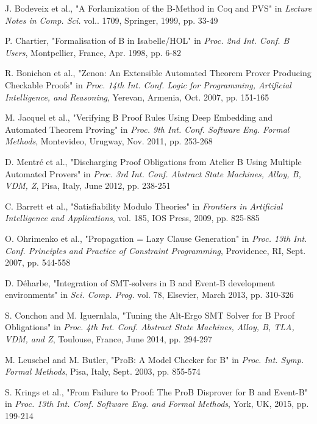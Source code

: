 \documentclass[11pt,journal]{IEEEtran}
\begin{document}
\begin{thebibliography}{1}
		J. Bodeveix et al., "A Forlamization of the B-Method in Coq and PVS" in \emph{Lecture Notes in Comp. Sci.} vol.. 1709, Springer, 1999, pp. 33-49
		
		P. Chartier, "Formalisation of B in Isabelle/HOL" in \emph{Proc. 2nd Int. Conf. B Users}, Montpellier, France, Apr. 1998, pp. 6-82
		
		R. Bonichon et al., "Zenon: An Extensible Automated Theorem Prover Producing Checkable Proofs" in \emph{Proc. 14th Int. Conf. Logic for Programming, Artificial Intelligence, and Reasoning}, Yerevan, Armenia, Oct. 2007, pp. 151-165
		
		M. Jacquel et al., "Verifying B Proof Rules Using Deep Embedding and Automated Theorem Proving" in \emph{Proc. 9th Int. Conf. Software Eng. Formal Methods}, Montevideo, Urugway, Nov. 2011, pp. 253-268
		
		D. Mentr\'{e} et al., "Discharging Proof Obligations from Atelier B Using Multiple Automated Provers" in \emph{Proc. 3rd Int. Conf. Abstract State Machines, Alloy, B, VDM, Z}, Pisa, Italy, June 2012, pp. 238-251
		
		C. Barrett et al., "Satisfiability Modulo Theories" in \emph{Frontiers in Artificial Intelligence and Applications}, vol. 185, IOS Press, 2009, pp. 825-885
		
		O. Ohrimenko et al., "Propagation = Lazy Clause Generation" in \emph{Proc. 13th Int. Conf. Principles and Practice of Constraint Programming}, Providence, RI, Sept. 2007, pp. 544-558
		
		D. D\'{e}harbe, "Integration of SMT-solvers in B and Event-B development environments" in \emph{Sci. Comp. Prog.} vol. 78, Elsevier, March 2013, pp. 310-326
		
		S. Conchon and M. Iguernlala, "Tuning the Alt-Ergo SMT Solver for B Proof Obligations" in \emph{Proc. 4th Int. Conf. Abstract State Machines, Alloy, B, TLA, VDM, and Z}, Toulouse, France, June 2014, pp. 294-297
		
		M. Leuschel and M. Butler, "ProB: A Model Checker for B" in \emph{Proc. Int. Symp. Formal Methods}, Pisa, Italy, Sept. 2003, pp. 855-574 
		
		S. Krings et al., "From Failure to Proof: The ProB Disprover for B and Event-B" in \emph{Proc. 13th Int. Conf. Software Eng. and Formal Methods}, York, UK, 2015, pp. 199-214
		

\end{thebibliography}
\end{document}
